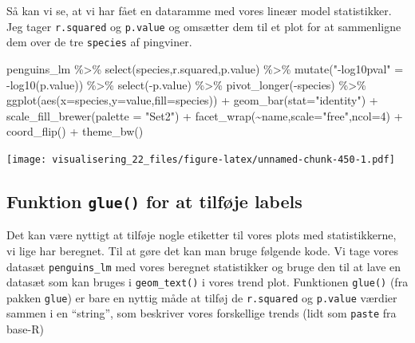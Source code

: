 \documentclass[
]{book}
\newenvironment{Shaded}{\begin{snugshade}}{\end{snugshade}}
\newcommand{\AttributeTok}[1]{\textcolor[rgb]{0.77,0.63,0.00}{#1}}
\newcommand{\DecValTok}[1]{\textcolor[rgb]{0.00,0.00,0.81}{#1}}
\newcommand{\FunctionTok}[1]{\textcolor[rgb]{0.00,0.00,0.00}{#1}}
\newcommand{\NormalTok}[1]{#1}
\newcommand{\OtherTok}[1]{\textcolor[rgb]{0.56,0.35,0.01}{#1}}
\newcommand{\SpecialCharTok}[1]{\textcolor[rgb]{0.00,0.00,0.00}{#1}}
\newcommand{\StringTok}[1]{\textcolor[rgb]{0.31,0.60,0.02}{#1}}
\begin{document}
Så kan vi se, at vi har fået en dataramme med vores lineær model statistikker. Jeg tager \texttt{r.squared} og \texttt{p.value} og omsætter dem til et plot for at sammenligne dem over de tre \texttt{species} af pingviner.

\begin{Shaded}
\begin{Highlighting}[]
\NormalTok{penguins\_lm }\SpecialCharTok{\%\textgreater{}\%} 
  \FunctionTok{select}\NormalTok{(species,r.squared,p.value) }\SpecialCharTok{\%\textgreater{}\%}
  \FunctionTok{mutate}\NormalTok{(}\StringTok{"{-}log10pval"} \OtherTok{=} \SpecialCharTok{{-}}\FunctionTok{log10}\NormalTok{(p.value)) }\SpecialCharTok{\%\textgreater{}\%}
  \FunctionTok{select}\NormalTok{(}\SpecialCharTok{{-}}\NormalTok{p.value) }\SpecialCharTok{\%\textgreater{}\%}
  \FunctionTok{pivot\_longer}\NormalTok{(}\SpecialCharTok{{-}}\NormalTok{species) }\SpecialCharTok{\%\textgreater{}\%}
  \FunctionTok{ggplot}\NormalTok{(}\FunctionTok{aes}\NormalTok{(}\AttributeTok{x=}\NormalTok{species,}\AttributeTok{y=}\NormalTok{value,}\AttributeTok{fill=}\NormalTok{species)) }\SpecialCharTok{+} 
  \FunctionTok{geom\_bar}\NormalTok{(}\AttributeTok{stat=}\StringTok{"identity"}\NormalTok{) }\SpecialCharTok{+} 
  \FunctionTok{scale\_fill\_brewer}\NormalTok{(}\AttributeTok{palette =} \StringTok{"Set2"}\NormalTok{) }\SpecialCharTok{+}
  \FunctionTok{facet\_wrap}\NormalTok{(}\SpecialCharTok{\textasciitilde{}}\NormalTok{name,}\AttributeTok{scale=}\StringTok{"free"}\NormalTok{,}\AttributeTok{ncol=}\DecValTok{4}\NormalTok{) }\SpecialCharTok{+}
  \FunctionTok{coord\_flip}\NormalTok{() }\SpecialCharTok{+}
  \FunctionTok{theme\_bw}\NormalTok{()}
\end{Highlighting}
\end{Shaded}

\texttt{[image: visualisering\_22\_files/figure-latex/unnamed-chunk-450-1.pdf]}

\hypertarget{funktion-glue-for-at-tilfuxf8je-labels}{%
\subsection{\texorpdfstring{Funktion \texttt{glue()} for at tilføje labels}{Funktion glue() for at tilføje labels}}\label{funktion-glue-for-at-tilfuxf8je-labels}}

Det kan være nyttigt at tilføje nogle etiketter til vores plots med statistikkerne, vi lige har beregnet. Til at gøre det kan man bruge følgende kode. Vi tage vores datasæt \texttt{penguins\_lm} med vores beregnet statistikker og bruge den til at lave en datasæt som kan bruges i \texttt{geom\_text()} i vores trend plot. Funktionen \texttt{glue()} (fra pakken \texttt{glue}) er bare en nyttig måde at tilføj de \texttt{r.squared} og \texttt{p.value} værdier sammen i en ``string'', som beskriver vores forskellige trends (lidt som \texttt{paste} fra base-R)
\end{document}
